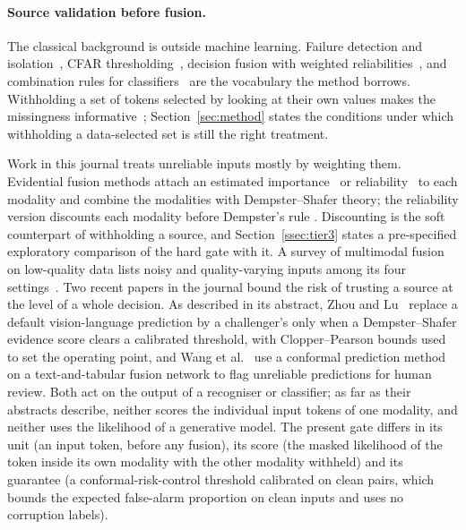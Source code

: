 \paragraph{Source validation before fusion.}
The classical background is outside machine learning.
Failure detection and isolation~\cite{willsky1976survey,gao2015survey}, CFAR thresholding~\cite{finn1968adaptive,rohling1983cfar,diao2024radar},
decision fusion with weighted reliabilities~\cite{chair1986optimal}, and combination rules for classifiers~\cite{kittler1998combining} are the vocabulary the method
borrows.
Withholding a set of tokens selected by looking at their own values makes the missingness informative~\cite{rubin1976inference};
Section~\ref{sec:method} states the conditions under which withholding a data-selected set is still the right treatment.

Work in this journal treats unreliable inputs mostly by weighting them.
Evidential fusion methods attach an estimated importance~\cite{shao2024ddef} or reliability~\cite{huang2025evidential} to each modality
and combine the modalities with Dempster--Shafer theory; the reliability version discounts each modality before Dempster's rule
\cite{huang2025evidential}. Discounting is the soft counterpart of withholding a source, and
Section~\ref{ssec:tier3} states a pre-specified exploratory comparison of the hard gate with it.
A survey of multimodal fusion on low-quality data lists noisy and quality-varying inputs among its four settings~\cite{zhang2026lowquality}.
Two recent papers in the journal bound the risk of trusting a source at the level of a whole decision.
As described in its abstract, Zhou and Lu~\cite{zhou2027burden} replace a default vision-language prediction by a challenger's
only when a Dempster--Shafer evidence score clears a calibrated threshold, with Clopper--Pearson bounds used to set the operating
point, and Wang et al.~\cite{wang2025multistage} use a conformal prediction method on a text-and-tabular fusion network to flag
unreliable predictions for human review. 
Both act on the output of a recogniser or classifier; as far as their abstracts describe, neither scores the individual input tokens of one modality, and neither uses the likelihood of a generative
model.
The present gate differs in its unit (an input token, before any fusion), its score (the masked likelihood of the token inside its
own modality with the other modality withheld) and its guarantee (a conformal-risk-control threshold calibrated on clean pairs,
which bounds the expected false-alarm proportion on clean inputs and uses no corruption labels).
